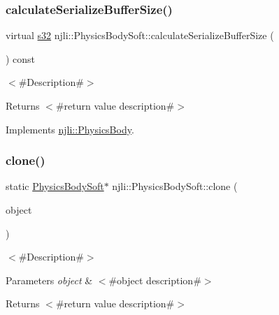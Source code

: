 \subsubsection{\texorpdfstring{calculate\+Serialize\+Buffer\+Size()}{calculateSerializeBufferSize()}}
{\footnotesize\ttfamily virtual \mbox{\hyperlink{_util_8h_aa62c75d314a0d1f37f79c4b73b2292e2}{s32}} njli\+::\+Physics\+Body\+Soft\+::calculate\+Serialize\+Buffer\+Size (\begin{DoxyParamCaption}{ }\end{DoxyParamCaption}) const\hspace{0.3cm}{\ttfamily [virtual]}}

$<$\#\+Description\#$>$

\begin{DoxyReturn}{Returns}
$<$\#return value description\#$>$ 
\end{DoxyReturn}


Implements \mbox{\hyperlink{classnjli_1_1_physics_body_a21bdbc459532f004dc4cd0e9c99a4765}{njli\+::\+Physics\+Body}}.

\mbox{\label{classnjli_1_1_physics_body_soft_a64e0e3a72cd3fc10fe0f877b1b4ba50e}} 
\subsubsection{\texorpdfstring{clone()}{clone()}}
{\footnotesize\ttfamily static \mbox{\hyperlink{classnjli_1_1_physics_body_soft}{Physics\+Body\+Soft}}$\ast$ njli\+::\+Physics\+Body\+Soft\+::clone (\begin{DoxyParamCaption}\item[{const \mbox{\hyperlink{classnjli_1_1_physics_body_soft}{Physics\+Body\+Soft}} \&}]{object }\end{DoxyParamCaption})\hspace{0.3cm}{\ttfamily [static]}}

$<$\#\+Description\#$>$


\begin{DoxyParams}{Parameters}
{\em object} & $<$\#object description\#$>$\\
\hline
\end{DoxyParams}
\begin{DoxyReturn}{Returns}
$<$\#return value description\#$>$ 
\end{DoxyReturn}
\mbox{\label{classnjli_1_1_physics_body_soft_a18f365a1ab8ddc523c38dddda20049dd}} 

